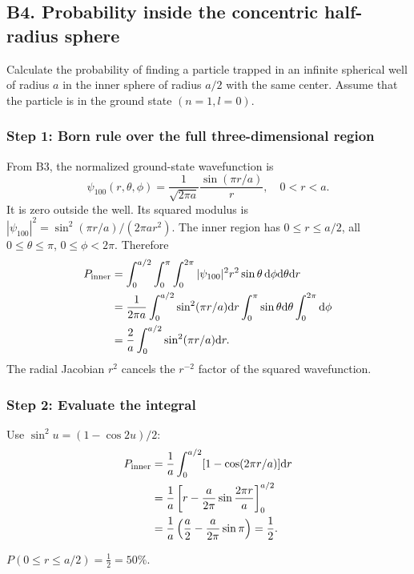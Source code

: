 \documentclass[11pt,a4paper]{article}
\newcommand{\key}[1]{\begin{resultbox}\centering\(\displaystyle #1\)\end{resultbox}}
\newcommand{\dd}{\mathrm{d}}
\begin{document}
\subsection{B4. Probability inside the concentric half-radius sphere}
\begin{questionbox}Calculate the probability of finding a particle trapped in an infinite spherical well of radius \(a\) in the inner sphere of radius \(a/2\) with the same center. Assume that the particle is in the ground state \((n=1,l=0)\).\end{questionbox}
\subsubsection*{Step 1: Born rule over the full three-dimensional region}
From B3, the normalized ground-state wavefunction is
\begin{equation}\psi_{100}(r,\theta,\phi)=\frac1{\sqrt{2\pi a}}\frac{\sin(\pi r/a)}r,\quad 0<r<a.\end{equation}
It is zero outside the well. Its squared modulus is \(|\psi_{100}|^2=\sin^2(\pi r/a)/(2\pi ar^2)\). The inner region has \(0\le r\le a/2\), all \(0\le\theta\le\pi\), \(0\le\phi<2\pi\). Therefore
\begin{align}
P_{\rm inner}&=\int_0^{a/2}\int_0^\pi\int_0^{2\pi}|\psi_{100}|^2r^2\sin\theta\,\dd\phi\dd\theta\dd r\\
&=\frac1{2\pi a}\int_0^{a/2}\sin^2(\pi r/a)\dd r\int_0^\pi\sin\theta\dd\theta\int_0^{2\pi}\dd\phi\\
&=\frac{2}{a}\int_0^{a/2}\sin^2(\pi r/a)\dd r.
\end{align}
The radial Jacobian \(r^2\) cancels the \(r^{-2}\) factor of the squared wavefunction.
\subsubsection*{Step 2: Evaluate the integral}
Use \(\sin^2u=(1-\cos2u)/2\):
\begin{align}
P_{\rm inner}&=\frac1a\int_0^{a/2}[1-\cos(2\pi r/a)]\dd r\\
&=\frac1a\left[r-\frac a{2\pi}\sin\frac{2\pi r}{a}\right]_0^{a/2}\\
&=\frac1a\left(\frac a2-\frac a{2\pi}\sin\pi\right)=\frac12.
\end{align}
\key{\boxed{P(0\le r\le a/2)=\frac12=50\%.}}
\end{document}
